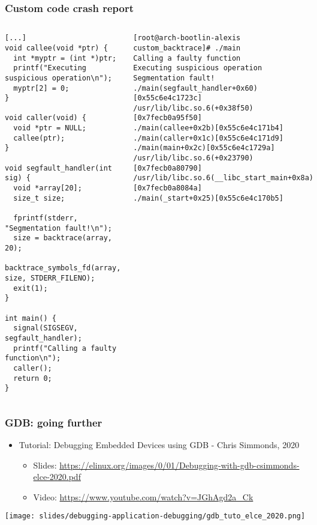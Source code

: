 \begin{frame}[fragile]
  \frametitle{Custom code crash report}
  \begin{columns}
    \begin{block}{}
      \begin{verbatim}
[...]
void callee(void *ptr) {
  int *myptr = (int *)ptr;
  printf("Executing suspicious operation\n");
  myptr[2] = 0;
}

void caller(void) {
  void *ptr = NULL;
  callee(ptr);
}

void segfault_handler(int sig) {
  void *array[20];
  size_t size;

  fprintf(stderr, "Segmentation fault!\n");
  size = backtrace(array, 20);
  backtrace_symbols_fd(array, size, STDERR_FILENO);
  exit(1);
}

int main() {
  signal(SIGSEGV, segfault_handler);
  printf("Calling a faulty function\n");
  caller();
  return 0;
}
      \end{verbatim}
    \end{block}
    \begin{block}{}
      \begin{verbatim}
[root@arch-bootlin-alexis custom_backtrace]# ./main
Calling a faulty function
Executing suspicious operation
Segmentation fault!
./main(segfault_handler+0x60)[0x55c6e4c1723c]
/usr/lib/libc.so.6(+0x38f50)[0x7fecb0a95f50]
./main(callee+0x2b)[0x55c6e4c171b4]
./main(caller+0x1c)[0x55c6e4c171d9]
./main(main+0x2c)[0x55c6e4c1729a]
/usr/lib/libc.so.6(+0x23790)[0x7fecb0a80790]
/usr/lib/libc.so.6(__libc_start_main+0x8a)[0x7fecb0a8084a]
./main(_start+0x25)[0x55c6e4c170b5]
      \end{verbatim}
    \end{block}
  \end{columns}
\end{frame}



\begin{frame}
  \frametitle{GDB: going further}
  \begin{itemize}
    \item Tutorial: Debugging Embedded Devices using GDB - Chris Simmonds, 2020
    \begin{itemize}
      \item Slides: \url{https://elinux.org/images/0/01/Debugging-with-gdb-csimmonds-elce-2020.pdf}
      \item Video: \url{https://www.youtube.com/watch?v=JGhAgd2a_Ck}
    \end{itemize}
  \end{itemize}
  \begin{center}
    \texttt{[image: slides/debugging-application-debugging/gdb\_tuto\_elce\_2020.png]}
  \end{center}
\end{frame}

